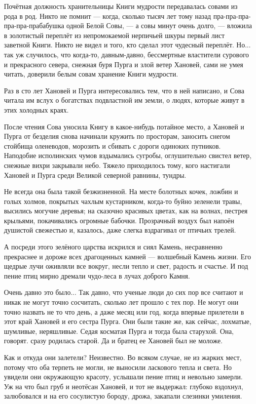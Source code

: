 \documentclass[oneside,final,14pt]{extreport}
\begin{document}
	Почётная должность хранительницы Книги мудрости передавалась совами из рода в род. Никто не помнит — когда, сколько тысяч лет тому назад пра-пра-пра-пра-пра-прабабушка одной Белой Совы, — а совы минут очень долго, — вложила в золотистый переплёт из непромокаемой нерпичьей шкуры первый лист заветной Книги. Никто не видел и того, кто сделал этот чудесный переплёт. Но... так уж случилось, что когда-то, давным-давно, бессмертные властители сурового и прекрасного севера, снежная буря Пурга и злой ветер Хановей, сами не умея читать, доверили белым совам хранение Книги мудрости.
	
	Раз в сто лет Хановей и Пурга интересовались тем, что в ней написано, и Сова читала им вслух о богатствах подвластной им земли, о людях, которые живут в этих холодных краях.
	
	После чтения Сова уносила Книгу в какое-нибудь потайное место, а Хановей и Пурга от безделия снова начинали кружить по просторам, заносить снегом стойбища оленеводов, морозить и сбивать с дороги одиноких путников. Наподобие исполинских чумов вздымались сугробы, оглушительно свистел ветер, снежные вихри закрывали небо. Тяжело приходилось тому, кого настигали Хановей и Пурга среди Великой северной равнины, тундры.
	
	Не всегда она была такой безжизненной. На месте болотных кочек, ложбин и голых холмов, покрытых чахлым кустарником, когда-то буйно зеленели травы, высились могучие деревья; на сказочно красивых цветах, как на волнах, пестрея крыльями, покачивались огромные бабочки. Прозрачный воздух был напоён душистой свежестью и, казалось, даже слегка вздрагивал от птичьих трелей.
	
	А посреди этого зелёного царства искрился и сиял Камень, несравненно прекраснее и дороже всех драгоценных камней — волшебный Камень жизни. Его щедрые лучи оживляли все вокруг, несли тепло и свет, радость и счастье. И под пение птиц мирно дремали чудо-леса в лучах доброго Камня.
	
	Очень давно это было... Так давно, что ученые люди до сих пор все считают и никак не могут точно сосчитать, сколько лет прошло с тех пор. Не могут они точно назвать не то что день, а даже месяц или год, когда впервые прилетели в этот край Хановей и его сестра Пурга. Они были такие же, как сейчас, лохматые, шумливые, неряшливые. Седая косматая Пурга и тогда была старухой. Она, говорят. сразу родилась старой. Да и братец ее Хановей был не моложе.
	
	Как и откуда они залетели? Неизвестно. Во всяком случае, не из жарких мест, потому что оба терпеть не могли, не выносили ласкового тепла и света. Но увидели они окружающую красоту, услышали пение птиц и невольно замерли. Уж на что был груб и неотёсан Хановей, и тот не выдержал: глубоко вздохнул, залюбовался и на его сосулистую бороду, дрожа, закапали слезинки умиления.
	
\end{document}
